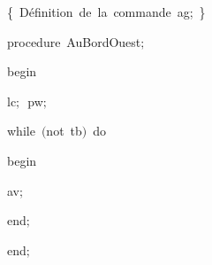 
{
\parindent {}
\medskip

\vspace{\neglskip}\mbox{\blc  \blk\idt  \cmt  \{\ Définition\ de\ la\ commande\ ag;\ \}\idt }\par 
\medskip

\pagebreak[3] 
\vspace{\neglskip}\mbox{\blc  \blk\idt  \mcl procedure\idt \ AuBordOuest$;$}\par 
\vspace{\neglskip}\mbox{\blc  \blk\idt  \mcl begin\idt }\par 
\vspace{\neglskip}\mbox{\blc  \blk\blk\idt  lc$;$\ pw$;$}\par 
\pagebreak[3] 
\vspace{\neglskip}\mbox{\blc  \blk\blk\idt  \mcl while\idt \ $($\mcl not\idt \ tb$)$\ \mcl do\idt }\par 
\vspace{\neglskip}\mbox{\blc  \blk\blk\blk\idt  \mcl begin\idt }\par 
\vspace{\neglskip}\mbox{\blc  \blk\blk\blk\blk\idt  av$;$\ }\par 
\vspace{\neglskip}\mbox{\blc  \blk\blk\blk\idt  \mcl end\idt $;$}\par 
\vspace{\neglskip}\mbox{\blc  \blk\idt  \mcl end\idt $;$}\par 
\medskip

}
